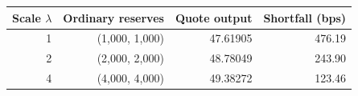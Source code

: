 \begin{center}\small
\begin{tabular}{@{}rrrr@{}}
\toprule
Scale $\lambda$ & Ordinary reserves & Quote output & Shortfall (bps) \\
\midrule
1 & (1,000, 1,000) & 47.61905 & 476.19 \\
2 & (2,000, 2,000) & 48.78049 & 243.90 \\
4 & (4,000, 4,000) & 49.38272 & 123.46 \\
\bottomrule
\end{tabular}
\end{center}
